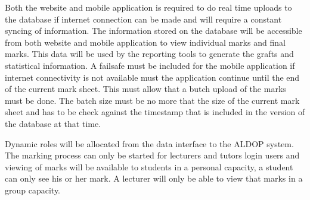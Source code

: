 \documentclass[12pt, a4paper]{scrartcl}
\begin{document}
			Both the website and mobile application is required to do real time uploads to the database if internet connection can be made and will require a constant syncing of information. The information stored on the database will be accessible from both website and mobile application to view individual marks and final marks. This data will be used by the reporting tools to generate the grafts and statistical information. A failsafe must be included for the mobile application if internet connectivity is not available must the application continue until the end of the current mark sheet. This must allow that a butch upload of the marks must be done. The batch size must be no more that the size of the current mark sheet and has to be check against the timestamp that is included in the version of the database at that time.

			Dynamic roles will be allocated from the data interface to the ALDOP system. The marking process can only be started for lecturers and tutors login users and viewing of marks will be available to students in a personal capacity, a student can only see his or her mark. A lecturer will only be able to view that marks in a group capacity.
\end{document}
